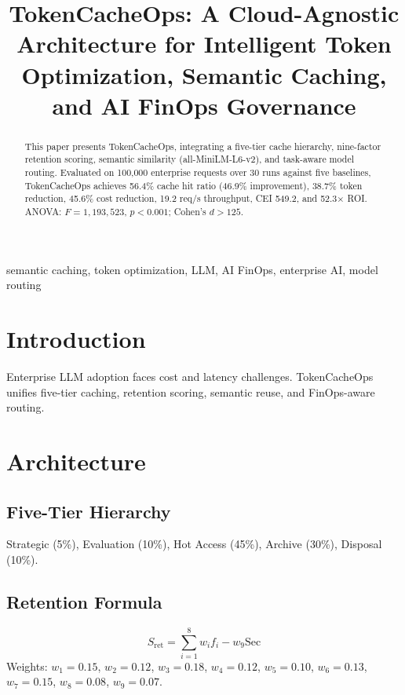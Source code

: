 \documentclass[conference]{IEEEtran}
\begin{document}
\title{TokenCacheOps: A Cloud-Agnostic Architecture for Intelligent Token Optimization, Semantic Caching, and AI FinOps Governance}

\author{
}

\maketitle

\begin{abstract}
This paper presents TokenCacheOps, integrating a five-tier cache hierarchy, nine-factor retention scoring, semantic similarity (all-MiniLM-L6-v2), and task-aware model routing. Evaluated on 100,000 enterprise requests over 30 runs against five baselines, TokenCacheOps achieves 56.4\% cache hit ratio (46.9\% improvement), 38.7\% token reduction, 45.6\% cost reduction, 19.2 req/s throughput, CEI 549.2, and 52.3$\times$ ROI. ANOVA: $F{=}1{,}193{,}523$, $p{<}0.001$; Cohen's $d{>}125$.
\end{abstract}

\begin{IEEEkeywords}
semantic caching, token optimization, LLM, AI FinOps, enterprise AI, model routing
\end{IEEEkeywords}

\section{Introduction}
Enterprise LLM adoption faces cost and latency challenges. TokenCacheOps unifies five-tier caching, retention scoring, semantic reuse, and FinOps-aware routing.

\section{Architecture}
\subsection{Five-Tier Hierarchy}
Strategic (5\%), Evaluation (10\%), Hot Access (45\%), Archive (30\%), Disposal (10\%).

\subsection{Retention Formula}
\begin{equation}
S_{\mathrm{ret}} = \sum_{i=1}^{8} w_i f_i - w_9 \mathrm{Sec}
\end{equation}
Weights: $w_1{=}0.15$, $w_2{=}0.12$, $w_3{=}0.18$, $w_4{=}0.12$, $w_5{=}0.10$, $w_6{=}0.13$, $w_7{=}0.15$, $w_8{=}0.08$, $w_9{=}0.07$.
\end{document}
